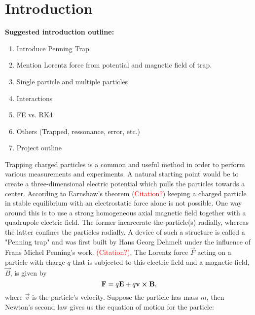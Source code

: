 \section{Introduction}\label{sec:introduction}


\textbf{Suggested introduction outline:}
\begin{enumerate}
    \item Introduce Penning Trap 
    \item Mention Lorentz force from potential and magnetic field of trap. 
    \item Single particle and multiple particles 
    \item Interactions 
    \item FE vs. RK4 
    \item Others (Trapped, ressonance, error, etc.)
    \item Project outline 
\end{enumerate}

Trapping charged particles is a common and useful method in order to perform various measurements and experiments. A natural starting point would be to create a three-dimensional electric potential which pulls the particles towards a center. According to Earnshaw's theorem (\textcolor{red}{Citation?}) keeping a charged particle in stable equilibrium with an electrostatic force alone is not possible. One way around this is to use a strong homogeneous axial magnetic field together with a quadrupole electric field. The former incarcerate the particle(s) radially, whereas the latter confines the particles radially. A device of such a structure is called a "Penning trap" and was first built by Hans Georg Dehmelt under the influence of Frans Michel Penning's work. \textcolor{red}{(Citation?)}. The Lorentz force $\vec{F}$ acting on a particle with charge $q$ that is subjected to this electric field and a magnetic field, $\vec{B}$, is given by 
\begin{equation}\label{eq:lorentz_force}
    \mathbf{F} = q\mathbf{E} + q \mathbf{v} \cross \mathbf{B},
\end{equation}
where $\vec{v}$ is the particle's velocity. Suppose the particle has mass $m$, then Newton's second law gives us the equation of motion for the particle:

